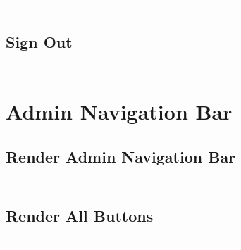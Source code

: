 \documentclass[12pt, letterpaper]{article}
\newcommand{\IPO}[3]{
  \begin{center}
    \begin{tabularx}{\linewidth}{XXX}
      \toprule
      \thead{Input} & \thead{Process} & \thead{Output} \\
      \midrule
      \RaggedRight{#1} & \RaggedRight{#2} & \RaggedRight{#3} \\
      \bottomrule
    \end{tabularx}
  \end{center}
}
\newcommand{\n}{\newline}
\begin{document}
\IPO{\begin{enumerate}\item User is logged in (\texttt{boolean}) \item User is admin (\texttt{false} if user is not logged in)\end{enumerate}}{Render ``Parts Inventory'' button\n Render ``basket'' button\n~\n\textbf{IF} user is logged in\n$\Rightarrow$ Render ``sign out'' button\n$\Rightarrow$ Render ``transactions'' button\n~\n\textbf{IF} user is admin\n$\Rightarrow$ Render ``parts'' button\n$\Rightarrow$Render (admin) ``transactions'' button}{Buttons}

\subsection{Sign Out}

\IPO{``Sign out'' button}{Use the destructured \texttt{logOut} function within Redwood's \texttt{useAuth} React hook.}{Same page the user was on originally}

\section{Admin Navigation Bar}

\subsection{Render Admin Navigation Bar}\label{adminnavbar}

\IPO{Child elements}{Render all buttons on navigation bar\n~\n Render child elements}{Page with admin navigation bar at the top}

\subsection{Render All Buttons}

\IPO{\begin{enumerate}\item Button label (\texttt{string}) \item Button destination URL (\texttt{string}) \item Title label (\texttt{string}) \item Title destination URL (\texttt{string})\end{enumerate}}{Render home button that goes to the catalog page (\ref{catalog})\n~\n Render title button with specified title and title destination URL\n~\n Render button with specified button destination URL}{Buttons}
\end{document}
